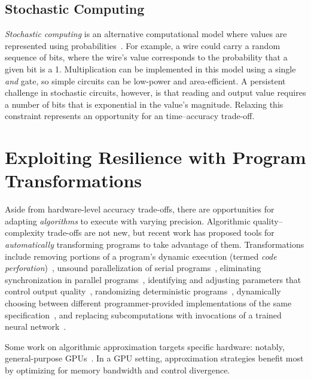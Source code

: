 \subsection{Stochastic Computing}

\emph{Stochastic computing} is an alternative computational model where values
are represented using probabilities~\cite{pcmos, pcmos-cacm,
palem-dac-position, stochasticproc, storm, lyric, mansinghka-circuits}.
For example, a wire could carry a random sequence of bits, where the wire's
value corresponds
to the probability that a given bit is a 1.
Multiplication can be implemented in this model using a single \emph{and}
gate, so simple circuits can be low-power and area-efficient.
A persistent challenge in stochastic circuits, however, is that reading and
output value requires a number of bits that is exponential in the value's
magnitude.
Relaxing this constraint represents an opportunity for an time--accuracy trade-off.


\section{Exploiting Resilience with Program Transformations}
\label{sec:related:software}

Aside from hardware-level accuracy trade-offs, there are opportunities for
adapting \emph{algorithms} to execute with varying precision. Algorithmic
quality--complexity trade-offs are not new, but recent work has
proposed
tools for \emph{automatically} transforming programs to take advantage of
them.
Transformations include removing portions of a program's dynamic execution
(termed \emph{code perforation})~\cite{perforation}, unsound
parallelization of serial programs~\cite{quickstep}, eliminating
synchronization in parallel programs~\cite{dubstep, races-ibm, hogwild,
forgiving-parallel},
identifying and adjusting parameters that control output
quality~\cite{dynamicknobs}, randomizing deterministic
programs~\cite{zhu-popl12, sasa-sas11}, dynamically choosing between
different programmer-provided implementations of the same
specification~\cite{green, virus, petabricks, taco-soc, ansel-autotuning,
scalable-classifier}, and replacing subcomputations with invocations
of a trained neural network~\cite{npu}.

Some work on algorithmic approximation targets specific hardware: notably,
general-purpose GPUs~\cite{paraprox, sage, herding, neuralgpu}.
In a GPU setting, approximation strategies benefit most by optimizing for
memory bandwidth and control divergence.


